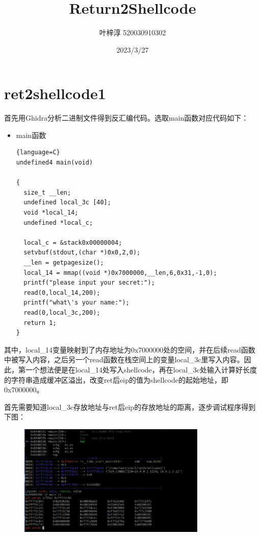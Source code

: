 \documentclass{article}
\date{2023/3/27}
\title{Return2Shellcode}
\author{叶梓淳 520030910302}
\begin{document}
\maketitle

\section{ret2shellcode1}
    首先用Ghidra分析二进制文件得到反汇编代码。选取main函数对应代码如下：
    \begin{itemize}
        \item main函数
        \begin{lstlisting}{language=C}
undefined4 main(void)

{
  size_t __len;
  undefined local_3c [40];
  void *local_14;
  undefined *local_c;
  
  local_c = &stack0x00000004;
  setvbuf(stdout,(char *)0x0,2,0);
  __len = getpagesize();
  local_14 = mmap((void *)0x7000000,__len,6,0x31,-1,0);
  printf("please input your secret:");
  read(0,local_14,200);
  printf("what\'s your name:");
  read(0,local_3c,200);
  return 1;
}

        \end{lstlisting}
    \end{itemize}
    其中，local\_14变量映射到了内存地址为0x7000000处的空间，并在后续read函数中被写入内容，之后另一个read函数在栈空间上的变量local\_3c里写入内容。因此，第一个想法便是在local\_14处写入shellcode，再在local\_3c处输入计算好长度的字符串造成缓冲区溢出，改变ret后eip的值为shellcode的起始地址，即0x7000000。\par
    首先需要知道local\_3c存放地址与ret后eip的存放地址的距离，逐步调试程序得到下图：
    \begin{figure}[H]
		\begin{center}
			\includegraphics[width=0.8\textwidth]{1.png}
		\end{center}
    \end{figure}
\end{document}
